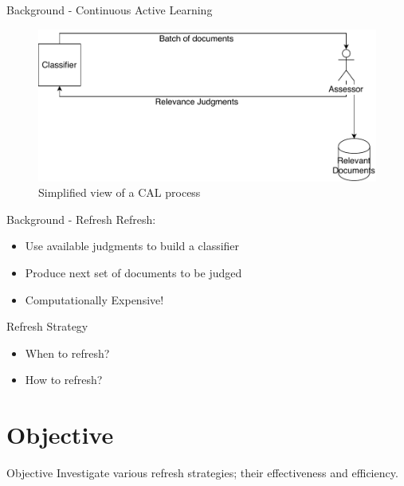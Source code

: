 \documentclass{beamer}
\begin{document}
\begin{frame}{Background - Continuous Active Learning}
\begin{figure}
 \centering 
 \includegraphics[width=1.0\textwidth]{diag.pdf}
 \caption{Simplified view of a CAL process}
\end{figure}
\end{frame}

\begin{frame}{Background - Refresh}
Refresh:
\begin{itemize}
    \item Use available judgments to build a classifier
    \item Produce next set of documents to be judged
    \item Computationally Expensive!
\end{itemize}

Refresh Strategy
\begin{itemize}
    \item When to refresh?
    \item How to refresh?
\end{itemize}
\end{frame}

\section{Objective}
\begin{frame}{Objective}
Investigate various refresh strategies; their effectiveness and efficiency.
\end{frame}
\end{document}
